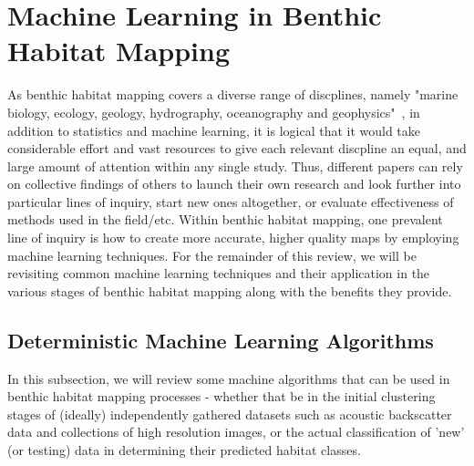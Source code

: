 \documentclass[12pt]{article}
\begin{document}
            \section{Machine Learning in Benthic Habitat Mapping}
            As benthic habitat mapping covers a diverse range of discplines, namely "marine biology, ecology, geology, hydrography, oceanography and geophysics"~\citep{cjbrown11}, in addition to statistics and machine learning, it is logical that it would take considerable effort and vast resources to give each relevant discpline an equal, and large amount of attention within any single study. Thus, different papers can rely on collective findings of others to launch their own research and look further into particular lines of inquiry, start new ones altogether, or evaluate effectiveness of methods used in the field/etc. Within benthic habitat mapping, one prevalent line of inquiry is how to create more accurate, higher quality maps by employing machine learning techniques. For the remainder of this review, we will be revisiting common machine learning techniques and their application in the various stages of benthic habitat mapping along with the benefits they provide.

            \subsection{Deterministic Machine Learning Algorithms}
            In this subsection, we will review some machine algorithms that can be used in benthic habitat mapping processes - whether that be in the initial clustering stages of (ideally) independently gathered datasets such as acoustic backscatter data and collections of high resolution images, or the actual classification of 'new' (or testing) data in determining their predicted habitat classes.
\end{document}
